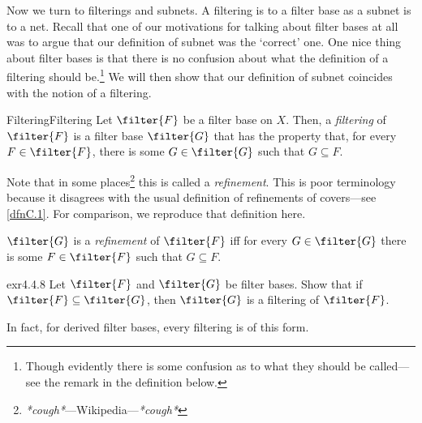 Now we turn to filterings and subnets.  A filtering is to a filter base as a subnet is to a net.  Recall that one of our motivations for talking about filter bases at all was to argue that our definition of subnet was the `correct' one.  One nice thing about filter bases is that there is no confusion about what the definition of a filtering should be.\footnote{Though evidently there is some confusion as to what they should be called---see the remark in the definition below.}  We will then show that our definition of subnet coincides with the notion of a filtering.
\begin{dfn}{Filtering}{Filtering}
Let $\filter{F}$ be a filter base on $X$.  Then, a \emph{filtering} of $\filter{F}$ is a filter base $\filter{G}$ that has the property that, for every $F\in \filter{F}$, there is some $G\in \filter{G}$ such that $G\subseteq F$.
\begin{rmk}
Note that in some places\footnote{\emph{*cough*}---Wikipedia---\emph{*cough*}} this is called a \emph{refinement}.  This is poor terminology because it disagrees with the usual definition of refinements of covers---see \cref{dfnC.1}.  For comparison, we reproduce that definition here.
\begin{textequation}
$\filter{G}$ is a \emph{refinement} of $\filter{F}$ iff for every $G\in \filter{G}$ there is some $F\in \filter{F}$ such that $G\subseteq F$.
\end{textequation}
\end{rmk}
\end{dfn}
\begin{exr}{}{exr4.4.8}
Let $\filter{F}$ and $\filter{G}$ be filter bases.  Show that if $\filter{F}\subseteq \filter{G}$, then $\filter{G}$ is a filtering of $\filter{F}$.
\end{exr}
In fact, for derived filter bases, every filtering is of this form.
